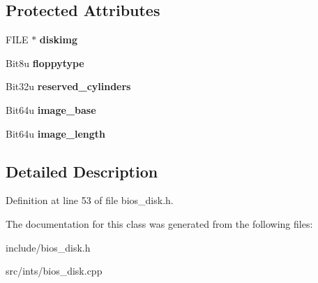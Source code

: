 \subsection*{Protected Attributes}
\begin{DoxyCompactItemize}
\item 
\hypertarget{classimageDisk_a97c3a05f12f94a92cf6ddac3f2a5dc5b}{F\-I\-L\-E $\ast$ {\bfseries diskimg}}\label{classimageDisk_a97c3a05f12f94a92cf6ddac3f2a5dc5b}

\item 
\hypertarget{classimageDisk_a6e6e4381d5627cb1516a6ced5e1a0b67}{Bit8u {\bfseries floppytype}}\label{classimageDisk_a6e6e4381d5627cb1516a6ced5e1a0b67}

\item 
\hypertarget{classimageDisk_a6588490a427230feac862942f34e401b}{Bit32u {\bfseries reserved\-\_\-cylinders}}\label{classimageDisk_a6588490a427230feac862942f34e401b}

\item 
\hypertarget{classimageDisk_aa12b7c8c8b8bc9745dd93a10d13d89b9}{Bit64u {\bfseries image\-\_\-base}}\label{classimageDisk_aa12b7c8c8b8bc9745dd93a10d13d89b9}

\item 
\hypertarget{classimageDisk_a97b1733c20d7a8e9a7479b268f75f074}{Bit64u {\bfseries image\-\_\-length}}\label{classimageDisk_a97b1733c20d7a8e9a7479b268f75f074}

\end{DoxyCompactItemize}


\subsection{Detailed Description}


Definition at line 53 of file bios\-\_\-disk.\-h.



The documentation for this class was generated from the following files\-:\begin{DoxyCompactItemize}
\item 
include/bios\-\_\-disk.\-h\item 
src/ints/bios\-\_\-disk.\-cpp\end{DoxyCompactItemize}
